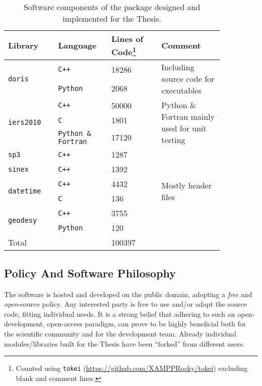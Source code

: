 \begin{table}[h!]
  \centering
  \begin{tabular}{p{0.20\linewidth} | p{0.2\linewidth} | p{0.20\linewidth} | p{0.25\linewidth}}
    \toprule
    \textbf{Library} & \textbf{Language} & \textbf{Lines of Code}\footnote{Counted using \texttt{tokei} (\url{https://github.com/XAMPPRocky/tokei}) excluding blank and comment lines.} & \textbf{Comment}\\
    \midrule
    \multirow{2}{*}{\texttt{doris}}  & \texttt{C++} & 18286 & \multirow{2}{4cm}{Including source code for executables}\\
      & \texttt{Python} & 2068 & \\
    \hline
    \multirow{3}{*}{\texttt{iers2010}}  & \texttt{C++} & 50000 & \multirow{3}{4cm}{Python \& Fortran mainly used for unit testing} \\
      & \texttt{C} & 1801 \\
      & \texttt{Python \& Fortran} &  17120 \\
    \hline
    \texttt{sp3}    & \texttt{C++} & 1287 & \\
    \hline
    \texttt{sinex}  & \texttt{C++} & 1392 & \\
    \hline
    \multirow{2}{*}{\texttt{datetime}}  & \texttt{C++} & 4432 & \multirow{2}{*}{Mostly header files}\\
      & \texttt{C}      & 136 \\
    \hline
    \multirow{2}{*}{\texttt{geodesy}}  & \texttt{C++} & 3755 & \multirow{2}{*}{}\\
      & \texttt{Python} & 120 \\
    \hline
    Total & & 100397\\
    \bottomrule
  \end{tabular}
  \caption{Software components of the package designed and implemented for the Thesis.}
  \label{table:software-components}
\end{table}

\subsection{Policy And Software Philosophy}\label{sec:the-software-policy}
The software is hosted and developed on the public domain, adopting a \emph{free} 
and \emph{open}-source policy. Any interested party is free to use and/or adapt 
the source code, fitting individual needs. It is a strong belief that adhering to 
such an open-development, open-access paradigm, can prove to be highly beneficial 
both for the scientific community and for the development team. Already individual 
modules/libraries built for the Thesis have been ``forked'' from different users.

